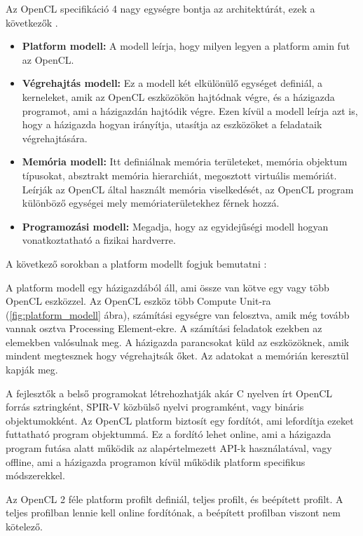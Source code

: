 Az OpenCL specifikáció 4 nagy egységre bontja az architektúrát, ezek a következők \cite{spec}.
\begin{itemize}
\item \textbf{Platform modell:} A modell leírja, hogy milyen legyen a platform amin fut az OpenCL. 
\item \textbf{Végrehajtás modell:} Ez a modell két elkülönülő egységet definiál, a kerneleket, amik az OpenCL eszközökön hajtódnak végre, és a házigazda programot, ami a házigazdán hajtódik végre. Ezen kívül a modell leírja azt is, hogy a házigazda hogyan irányítja, utasítja az eszközöket a feladataik végrehajtására.
\item \textbf{Memória modell:} Itt definiálnak memória területeket,  memória objektum típusokat, absztrakt memória hierarchiát, megosztott virtuális memóriát. Leírják az OpenCL által használt memória viselkedését, az OpenCL program különböző egységei mely memóriaterületekhez férnek hozzá.
\item \textbf{Programozási modell:} Megadja, hogy az egyidejűségi modell hogyan vonatkoztatható a fizikai hardverre.

\end{itemize}

A következő sorokban a platform modellt fogjuk bemutatni \cite{spec}:

A platform modell egy házigazdából áll, ami össze van kötve egy vagy több OpenCL eszközzel. Az OpenCL eszköz több Compute Unit-ra (\ref{fig:platform_modell} ábra), számítási egységre van felosztva, amik még tovább vannak osztva Processing Element-ekre. A számítási feladatok ezekben az elemekben valósulnak meg. A házigazda parancsokat küld az eszközöknek, amik mindent megtesznek hogy végrehajtsák őket. Az adatokat a memórián keresztül kapják meg. 

A fejlesztők a belső programokat létrehozhatják akár C nyelven írt OpenCL forrás sztringként, SPIR-V közbülső nyelvi programként, vagy bináris objektumokként. Az OpenCL platform biztosít egy fordítót, ami lefordítja ezeket futtatható program objektummá. Ez a fordító lehet online, ami a házigazda program futása alatt működik az alapértelmezett API-k használatával, vagy offline, ami a házigazda programon kívül működik platform specifikus módszerekkel.

Az OpenCL 2 féle platform profilt definiál, teljes profilt, és beépített profilt. A teljes profilban lennie kell online fordítónak, a beépített profilban viszont nem kötelező.

